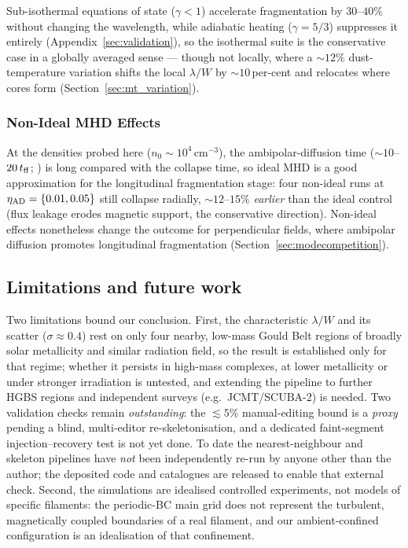 \documentclass[usenatbib,twoside,twocolumn]{mnras}
\begin{document}
Sub-isothermal equations of state ($\gamma<1$) accelerate fragmentation by $30$--$40\%$ without changing the wavelength, while adiabatic heating ($\gamma=5/3$) suppresses it entirely (Appendix~\ref{sec:validation}), so the isothermal suite is the conservative case in a globally averaged sense --- though not locally, where a $\sim12\%$ dust-temperature variation shifts the local $\lambda/W$ by $\sim10$\,per-cent and relocates where cores form (Section~\ref{sec:mt_variation}).

\subsubsection{Non-Ideal MHD Effects}
\label{sec:nonideal}

At the densities probed here ($n_0\sim10^4$\,cm$^{-3}$), the ambipolar-diffusion time ($\sim10$--$20\,t_{\rm ff}$; \citealt{Tassis2004}) is long compared with the collapse time, so ideal MHD is a good approximation for the longitudinal fragmentation stage: four non-ideal runs at $\eta_{\rm AD}=\{0.01,0.05\}$ still collapse radially, $\sim12$--$15\%$ \textit{earlier} than the ideal control (flux leakage erodes magnetic support, the conservative direction). Non-ideal effects nonetheless change the outcome for perpendicular fields, where ambipolar diffusion promotes longitudinal fragmentation (Section~\ref{sec:modecompetition}).

\subsection{Limitations and future work}
\label{sec:limitations}

Two limitations bound our conclusion. First, the characteristic $\lambda/W$ and its scatter ($\sigma\approx0.4$) rest on only four nearby, low-mass Gould Belt regions of broadly solar metallicity and similar radiation field, so the result is established only for that regime; whether it persists in high-mass complexes, at lower metallicity or under stronger irradiation is untested, and extending the pipeline to further HGBS regions and independent surveys (e.g.\ JCMT/SCUBA-2) is needed. Two validation checks remain \emph{outstanding}: the $\lesssim5\%$ manual-editing bound is a \emph{proxy} pending a blind, multi-editor re-skeletonisation, and a dedicated faint-segment injection--recovery test is not yet done. To date the nearest-neighbour and skeleton pipelines have \emph{not} been independently re-run by anyone other than the author; the deposited code and catalogues are released to enable that external check. Second, the simulations are idealised controlled experiments, not models of specific filaments: the periodic-BC main grid does not represent the turbulent, magnetically coupled boundaries of a real filament, and our ambient-confined configuration is an idealisation of that confinement.
\end{document}
